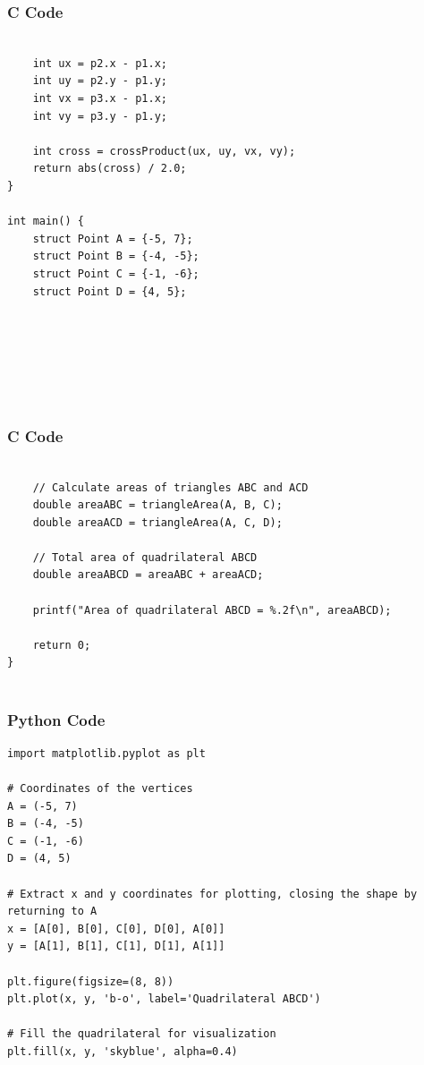 \documentclass{beamer}
\begin{document}
\begin{frame}[fragile]
    \frametitle{C Code }
    \begin{lstlisting}

    int ux = p2.x - p1.x;
    int uy = p2.y - p1.y;
    int vx = p3.x - p1.x;
    int vy = p3.y - p1.y;

    int cross = crossProduct(ux, uy, vx, vy);
    return abs(cross) / 2.0;
}

int main() {
    struct Point A = {-5, 7};
    struct Point B = {-4, -5};
    struct Point C = {-1, -6};
    struct Point D = {4, 5};







    \end{lstlisting}
\end{frame}


\begin{frame}[fragile]
    \frametitle{C Code}
    \begin{lstlisting}

    // Calculate areas of triangles ABC and ACD
    double areaABC = triangleArea(A, B, C);
    double areaACD = triangleArea(A, C, D);

    // Total area of quadrilateral ABCD
    double areaABCD = areaABC + areaACD;

    printf("Area of quadrilateral ABCD = %.2f\n", areaABCD);

    return 0;
}


    \end{lstlisting}
\end{frame}







\begin{frame}[fragile]
    \frametitle{Python Code}
    \begin{lstlisting}
import matplotlib.pyplot as plt

# Coordinates of the vertices
A = (-5, 7)
B = (-4, -5)
C = (-1, -6)
D = (4, 5)

# Extract x and y coordinates for plotting, closing the shape by returning to A
x = [A[0], B[0], C[0], D[0], A[0]]
y = [A[1], B[1], C[1], D[1], A[1]]

plt.figure(figsize=(8, 8))
plt.plot(x, y, 'b-o', label='Quadrilateral ABCD')

# Fill the quadrilateral for visualization
plt.fill(x, y, 'skyblue', alpha=0.4)





    \end{lstlisting}
\end{frame}
\end{document}
